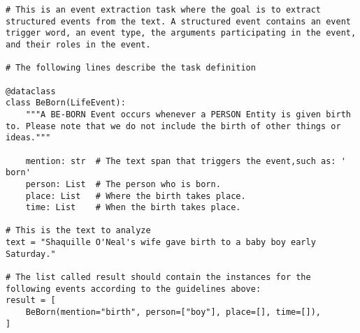 \begin{figure*}[t]
    \centering
    \vspace{-5mm} %
    \begin{lstlisting}[style=gollie, caption=Example Code Prompt for Event Extraction. This is for demonstration and we can remove it and keep the shorter one above to save space., label={lst:code-prompt}]
# This is an event extraction task where the goal is to extract structured events from the text. A structured event contains an event trigger word, an event type, the arguments participating in the event, and their roles in the event. 

# The following lines describe the task definition

@dataclass
class BeBorn(LifeEvent):
    """A BE-BORN Event occurs whenever a PERSON Entity is given birth to. Please note that we do not include the birth of other things or ideas."""
    
    mention: str  # The text span that triggers the event,such as: ' born'
    person: List  # The person who is born.
    place: List   # Where the birth takes place.
    time: List    # When the birth takes place.

# This is the text to analyze
text = "Shaquille O'Neal's wife gave birth to a baby boy early Saturday."

# The list called result should contain the instances for the following events according to the guidelines above:
result = [
    BeBorn(mention="birth", person=["boy"], place=[], time=[]), 
]
    \end{lstlisting}
\end{figure*}
